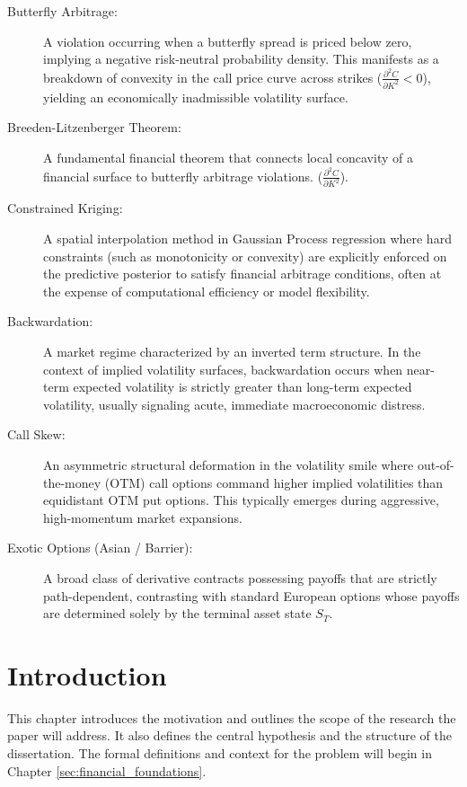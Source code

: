 \documentclass[12pt,oneside]{report}
\theoremstyle{definition}
\theoremstyle{remark}
\begin{document}
\begin{description}
    \item[Butterfly Arbitrage:] A violation occurring when a butterfly spread is priced below zero, implying a negative risk-neutral probability density. This manifests as a breakdown of convexity in the call price curve across strikes ($\frac{\partial^2 C}{\partial K^2} < 0$), yielding an economically inadmissible volatility surface.
    \item[Breeden-Litzenberger Theorem:] A fundamental financial theorem that connects local concavity of a financial surface to butterfly arbitrage violations. 
     ($\frac{\partial^2 C}{\partial K^2}$).
     \item[Constrained Kriging:] A spatial interpolation method in Gaussian Process regression where hard constraints (such as monotonicity or convexity) are explicitly enforced on the predictive posterior to satisfy financial arbitrage conditions, often at the expense of computational efficiency or model flexibility.
     \item[Backwardation:] A market regime characterized by an inverted term structure. In the context of implied volatility surfaces, backwardation occurs when near-term expected volatility is strictly greater than long-term expected volatility, usually signaling acute, immediate macroeconomic distress.
     \item[Call Skew:] An asymmetric structural deformation in the volatility smile where out-of-the-money (OTM) call options command higher implied volatilities than equidistant OTM put options. This typically emerges during aggressive, high-momentum market expansions.
     \item[Exotic Options (Asian / Barrier):] A broad class of derivative contracts possessing payoffs that are strictly path-dependent, contrasting with standard European options whose payoffs are determined solely by the terminal asset state $S_T$.
\end{description}

\newpage

\chapter{Introduction}
This chapter introduces the motivation and outlines the scope of the research the paper will address. It also defines the central hypothesis and the structure of the dissertation. The formal definitions and context for the problem will begin in Chapter \ref{sec:financial_foundations}.
\end{document}
